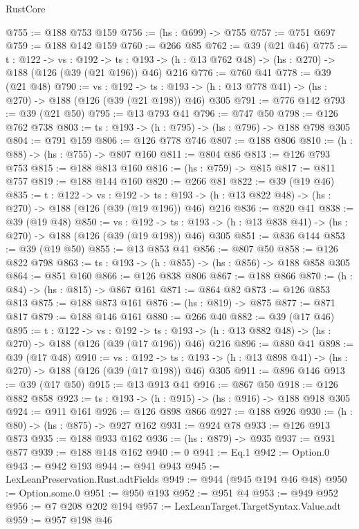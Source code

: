 \begin{lexlean}{RustCore}
\begin{coremodule}
@755 := @188 @753 @159
@756 := (hs : @699) -> @755
@757 := @751 @697
@759 := @188 @142 @159
@760 := @266 @85
@762 := @39 (@21 @46)
@775 := {t : @122} ->
  {vs : @192} ->
  {ts : @193} -> (h : @13 @762 @48) -> (hs : @270) -> @188 (@126 (@39 (@21 @196)) @46) @216
@776 := @760 @41
@778 := @39 (@21 @48)
@790 := {vs : @192} ->
  {ts : @193} -> (h : @13 @778 @41) -> (hs : @270) -> @188 (@126 (@39 (@21 @198)) @46) @305
@791 := @776 @142
@793 := @39 (@21 @50)
@795 := @13 @793 @41
@796 := @747 @50
@798 := @126 @762 @738
@803 := {ts : @193} -> (h : @795) -> (hs : @796) -> @188 @798 @305
@804 := @791 @159
@806 := @126 @778 @746
@807 := @188 @806
@810 := (h : @88) -> (hs : @755) -> @807 @160
@811 := @804 @86
@813 := @126 @793 @753
@815 := @188 @813 @160
@816 := (hs : @759) -> @815
@817 := @811 @757
@819 := @188 @144 @160
@820 := @266 @81
@822 := @39 (@19 @46)
@835 := {t : @122} ->
  {vs : @192} ->
  {ts : @193} -> (h : @13 @822 @48) -> (hs : @270) -> @188 (@126 (@39 (@19 @196)) @46) @216
@836 := @820 @41
@838 := @39 (@19 @48)
@850 := {vs : @192} ->
  {ts : @193} -> (h : @13 @838 @41) -> (hs : @270) -> @188 (@126 (@39 (@19 @198)) @46) @305
@851 := @836 @144
@853 := @39 (@19 @50)
@855 := @13 @853 @41
@856 := @807 @50
@858 := @126 @822 @798
@863 := {ts : @193} -> (h : @855) -> (hs : @856) -> @188 @858 @305
@864 := @851 @160
@866 := @126 @838 @806
@867 := @188 @866
@870 := (h : @84) -> (hs : @815) -> @867 @161
@871 := @864 @82
@873 := @126 @853 @813
@875 := @188 @873 @161
@876 := (hs : @819) -> @875
@877 := @871 @817
@879 := @188 @146 @161
@880 := @266 @40
@882 := @39 (@17 @46)
@895 := {t : @122} ->
  {vs : @192} ->
  {ts : @193} -> (h : @13 @882 @48) -> (hs : @270) -> @188 (@126 (@39 (@17 @196)) @46) @216
@896 := @880 @41
@898 := @39 (@17 @48)
@910 := {vs : @192} ->
  {ts : @193} -> (h : @13 @898 @41) -> (hs : @270) -> @188 (@126 (@39 (@17 @198)) @46) @305
@911 := @896 @146
@913 := @39 (@17 @50)
@915 := @13 @913 @41
@916 := @867 @50
@918 := @126 @882 @858
@923 := {ts : @193} -> (h : @915) -> (hs : @916) -> @188 @918 @305
@924 := @911 @161
@926 := @126 @898 @866
@927 := @188 @926
@930 := (h : @80) -> (hs : @875) -> @927 @162
@931 := @924 @78
@933 := @126 @913 @873
@935 := @188 @933 @162
@936 := (hs : @879) -> @935
@937 := @931 @877
@939 := @188 @148 @162
@940 := 0
@941 := Eq.{1}
@942 := Option.{0}
@943 := @942 @193
@944 := @941 @943
@945 := LexLeanPreservation.Rust.adtFields
@949 := @944 (@945 @194 @46 @48)
@950 := Option.some.{0}
@951 := @950 @193
@952 := @951 @4
@953 := @949 @952
@956 := @7 @208 @202 @194
@957 := LexLeanTarget.TargetSyntax.Value.adt
@959 := @957 @198 @46

\end{coremodule}
\end{lexlean}
